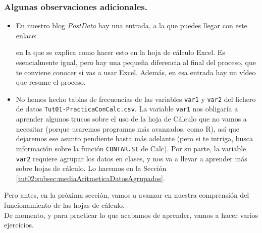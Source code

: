 \documentclass[10pt,a4paper]{article}\usepackage[]{graphicx}\usepackage[]{color}
\begin{document}
\subsubsection*{Algunas observaciones adicionales.}
\label{tut01:subsubsec:ObservacionesAdicionalesTablasFrecuenciaSencillas}
\begin{itemize}
    \item En nuestro blog {\em PostData} hay una entrada, a la que puedes llegar con este enlace:
    {\scriptsize
    \begin{center}
     \end{center}
    }
    en la que se explica como hacer esto en la hoja de cálculo Excel. Es esencialmente igual, pero hay una pequeña diferencia al final del proceso, que te conviene conocer si vas a usar  Excel. Además, en esa entrada hay un vídeo que resume el proceso.

  \item No hemos hecho tablas de frecuencias de las variables {\tt var1} y {\tt var2} del fichero de datos {\tt Tut01-PracticaConCalc.csv}. La variable {\tt var1} nos obligaría a aprender algunos trucos sobre el uso de la hoja de Cálculo que no vamos a necesitar (porque usaremos programas más avanzados, como R), así que dejaremos ese asunto pendiente hasta más adelante (pero si te intriga, busca información sobre la función {\tt CONTAR.SI} de Calc). Por su parte, la variable {\tt var2} requiere agrupar los datos en clases, y nos va a llevar a aprender más sobre hojas de cálculo. Lo haremos en la Sección \ref{tut02:subsec:mediaAritmeticaDatosAgrupados}.
\end{itemize}
Pero antes, en la próxima sección, vamos a avanzar en nuestra comprensión del funcionamiento de las hojas de cálculo. \\

De momento, y para practicar lo que acabamos de aprender, vamos a hacer varios ejercicios.\\
\end{document}
